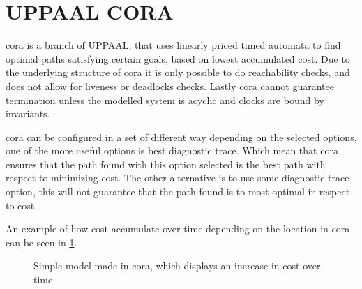 \section{UPPAAL CORA}\label{sec:upp_cora}
\acrfull{cora} is a branch of UPPAAL, that uses linearly priced timed automata to find optimal paths satisfying certain goals, based on lowest accumulated cost\cite{cs_cora}. Due to the underlying structure of \gls{cora} it is only possible to do reachability checks, and does not allow for liveness or deadlocks checks. Lastly \gls{cora} cannot guarantee termination unless the modelled system is acyclic and clocks are bound by invariants\cite{uppaal_cora_download}.

\gls{cora} can be configured in a set of different way depending on the selected options, one of the more useful options is best diagnostic trace. Which mean that \gls{cora} ensures that the path found with this option selected is the best path with respect to minimizing cost. The other alternative is to use some diagnostic trace option, this will not guarantee that the path found is to most optimal in respect to cost.

An example of how cost accumulate over time depending on the location in \gls{cora} can be seen in \cref{fig:cora_eks}.

\begin{figure}[H]
	\centering
	\caption{Simple model made in \gls{cora}, which displays an increase in cost over time}
	\label{fig:cora_eks}
\end{figure}

